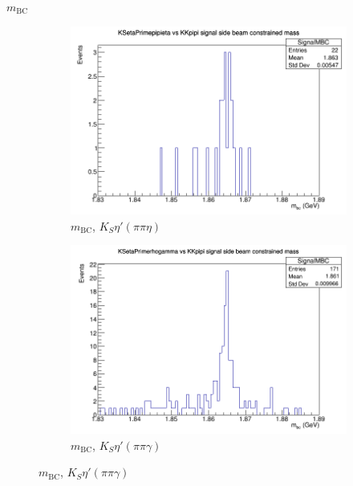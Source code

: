 \documentclass{beamer}
\begin{document}
\begin{frame}{$m_\text{BC}$}
\begin{figure}
\begin{subfigure}{0.4\textwidth}
      \includegraphics[width=\textwidth]{KSetaPrimepipietaSignalMBC.png}
      \caption{$m_\text{BC}$, $K_S\eta'(\pi\pi\eta)$}
    \end{subfigure}%
    \begin{subfigure}{0.4\textwidth}
      \centering
      \includegraphics[width=\textwidth]{KSetaPrimerhogammaSignalMBC.png}
      \caption{$m_\text{BC}$, $K_S\eta'(\pi\pi\gamma)$}
    \end{subfigure}
  \end{figure}
\end{frame}
\end{document}
